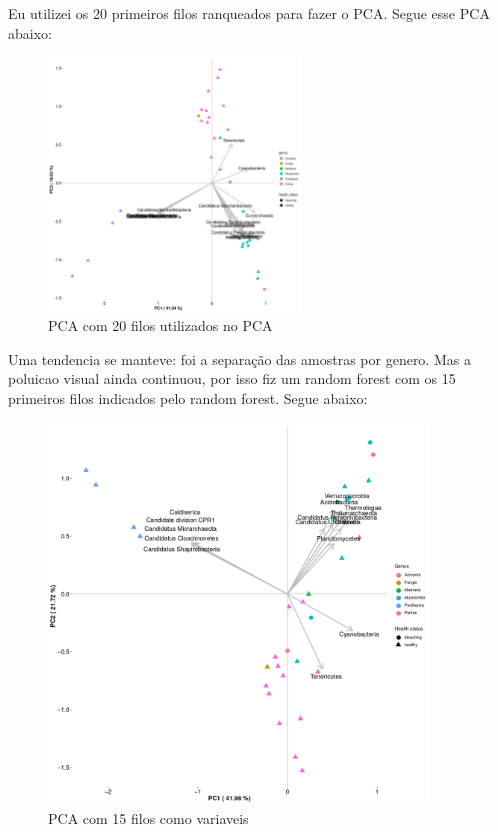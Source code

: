 \documentclass[12pt, a4paper]{report}
\begin{document}
Eu utilizei os 20 primeiros filos ranqueados para fazer o PCA. Segue esse PCA abaixo:

\begin{figure}[!h]
  \centering 
  \includegraphics[width=0.6\textwidth]{figures/output_rf_20_PCA_corais_2018_10_01.jpg}
  \caption{PCA com 20 filos utilizados no PCA}
  \end{figure}
\newpage
Uma tendencia se manteve: foi a separação das amostras por genero.  Mas a poluicao visual ainda continuou, por isso fiz um random forest com os 15 primeiros filos indicados pelo random forest. Segue abaixo: 
\begin{figure}[!h]
  \centering 
  \includegraphics[width=0.9\textwidth]{figures/output_rf_15_PCA_corais_2018_10_01_edited_3.png}
  \caption{PCA com 15 filos como variaveis}
  \end{figure}
\end{document}
